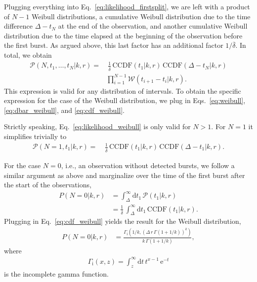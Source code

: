 \documentclass[fleqn,usenatbib]{mnras}
\renewcommand{\d}{\delta}
\begin{document}
Plugging everything into Eq.~\eqref{eq:likelihood_firstsplit}, we are left with a product of $N - 1$ Weibull distributions, a cumulative Weibull distribution due to the time difference $\Delta - t_N$ at the end of the observation, and another cumulative Weibull distribution due to the time elapsed at the beginning of the observation before the first burst. As argued above, this last factor has an additional factor $1/\bar{\d}$. In total, we obtain
\begin{align}
	\label{eq:likelihood_weibull}
	\mathcal{P}(N,t_1,\dots,t_N|k,r) =& ~\frac{1}{\bar{\d}} \, \mathrm{CCDF}(t_1|k,r) \, \mathrm{CCDF}(\Delta - t_N|k,r)\nonumber\\
	&\prod_{i=1}^{N-1} \mathcal{W}(t_{i+1} - t_i|k,r).
\end{align}
This expression is valid for any distribution of intervals. To obtain the specific expression for the case of the Weibull distribution, we plug in Eqs.~\eqref{eq:weibull}, \eqref{eq:dbar_weibull}, and \eqref{eq:cdf_weibull}.

Strictly speaking, Eq.~\eqref{eq:likelihood_weibull} is only valid for $N > 1$. For $N = 1$ it simplifies trivially to
\begin{align}
	\label{eq:likelihood_N1}
	\mathcal{P}(N=1,t_1|k,r) =& ~\frac{1}{\bar{\d}} \, \mathrm{CCDF}(t_1|k,r) \, \mathrm{CCDF}(\Delta - t_1|k,r).
\end{align}

For the case $N=0$, i.e., an observation without detected bursts, we follow a similar argument as above and marginalize over the time of the first burst after the start of the observations,
\begin{align}
	P(N=0|k,r) &= \int_\Delta^\infty \mathrm{d}t_1 \, \mathcal{P}(t_1|k,r)\nonumber\\
	&= \frac{1}{\bar{\d}} \, \int_\Delta^\infty \mathrm{d}t_1 \, \mathrm{CCDF}(t_1|k,r).
\end{align}
Plugging in Eq.~\eqref{eq:cdf_weibull} yields the result for the Weibull distribution,
\begin{align}
	\label{eq:likelihood_N0}
	P(N=0|k,r) &= \frac{\Gamma_\mathrm{i}{\left(1/k, \left(\Delta\,r\,\Gamma(1+1/k)\right)^k\right)}}{k\,\Gamma{\left(1+1/k\right)}},
\end{align}
where
\begin{align}
	\Gamma_\mathrm{i}(x,z) = \int_z^\infty \mathrm{d}t \, t^{x-1} \, \mathrm{e}^{-t}
\end{align}
is the incomplete gamma function.
\end{document}
